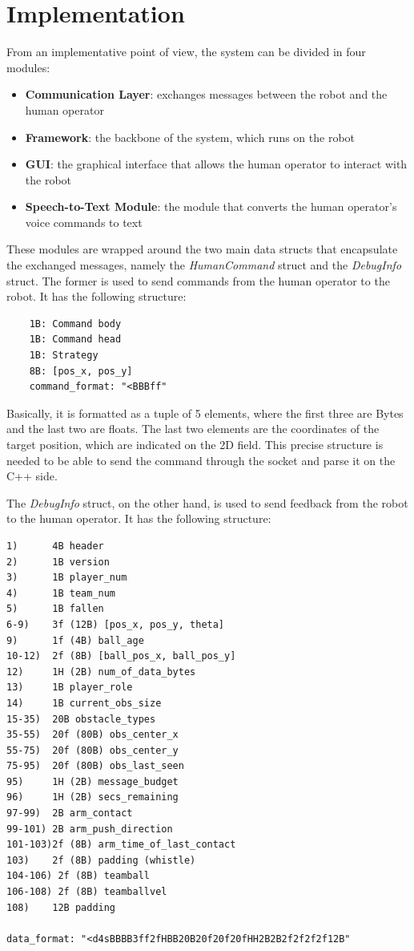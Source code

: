 \documentclass[a4paper, onecolumn, 12pt]{article}
\begin{document}
\newpage
\section{Implementation}
\label{sec:impl}

From an implementative point of view, the system can be divided in four modules: 
\begin{itemize}
    \item \textbf{Communication Layer}: exchanges messages between the robot and the human operator
    \item \textbf{Framework}: the backbone of the system, which runs on the robot
    \item \textbf{GUI}: the graphical interface that allows the human operator to interact with the robot
    \item \textbf{Speech-to-Text Module}: the module that converts the human operator's voice commands to text
\end{itemize}

These modules are wrapped around the two main data structs that encapsulate the
exchanged messages, namely the \textit{HumanCommand} struct and the
\textit{DebugInfo} struct. The former is used to send commands from the human
operator to the robot. It has the following structure:
\begin{verbatim}
    1B: Command body
    1B: Command head
    1B: Strategy
    8B: [pos_x, pos_y]
    command_format: "<BBBff"
\end{verbatim}

Basically, it is formatted as a tuple of 5 elements, where the first three are
Bytes and the last two are floats. The last two elements are the coordinates of
the target position, which are indicated on the 2D field. This precise structure
is needed to be able to send the command through the socket and parse it on the
C++ side.

The \textit{DebugInfo} struct, on the other hand, is used to send feedback from
the robot to the human operator. It has the following structure:

\begin{verbatim}
1)      4B header
2)      1B version
3)      1B player_num
4)      1B team_num
5)      1B fallen
6-9)    3f (12B) [pos_x, pos_y, theta]
9)      1f (4B) ball_age
10-12)  2f (8B) [ball_pos_x, ball_pos_y]
12)     1H (2B) num_of_data_bytes
13)     1B player_role
14)     1B current_obs_size
15-35)  20B obstacle_types  
35-55)  20f (80B) obs_center_x
55-75)  20f (80B) obs_center_y
75-95)  20f (80B) obs_last_seen
95)     1H (2B) message_budget
96)     1H (2B) secs_remaining
97-99)  2B arm_contact
99-101) 2B arm_push_direction
101-103)2f (8B) arm_time_of_last_contact
103)    2f (8B) padding (whistle)
104-106) 2f (8B) teamball
106-108) 2f (8B) teamballvel
108)    12B padding

data_format: "<d4sBBBB3ff2fHBB20B20f20f20fHH2B2B2f2f2f2f12B"
\end{verbatim}
\end{document}

